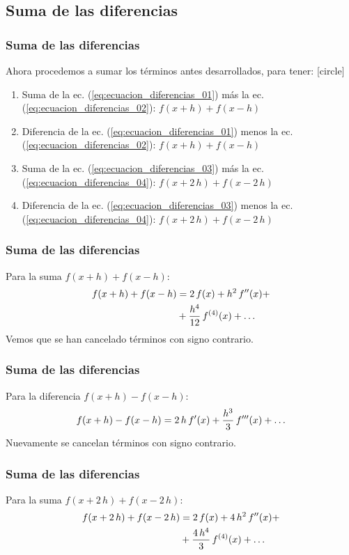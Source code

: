 \subsection*{Suma de las diferencias}
\begin{frame}
\frametitle{Suma de las diferencias}
Ahora procedemos a sumar los términos antes desarrollados, para tener:
[circle]
\begin{enumerate}[<+->]
\item Suma de la ec. (\ref{eq:ecuacion_diferencias_01}) más la ec. (\ref{eq:ecuacion_diferencias_02}): $f(x + h) + f(x - h)$
\item Diferencia de la ec. (\ref{eq:ecuacion_diferencias_01}) menos la ec. (\ref{eq:ecuacion_diferencias_02}): $f(x + h) + f(x - h)$
\item Suma de la ec. (\ref{eq:ecuacion_diferencias_03}) más la ec. (\ref{eq:ecuacion_diferencias_04}): $f(x + 2 \, h) + f(x - 2 \, h)$
\item Diferencia de la ec. (\ref{eq:ecuacion_diferencias_03}) menos la ec. (\ref{eq:ecuacion_diferencias_04}): $f(x + 2 \, h) + f(x - 2\,  h)$
\end{enumerate}
\end{frame}
\begin{frame}
\frametitle{Suma de las diferencias}
Para la suma $f(x + h) + f(x - h)$:
\begin{align}
\begin{aligned}
f(x + h) + f(x - h) &= 2 \, f(x) + h^{2} \, {f}^{\prime \prime} (x) + \\ 
&+\dfrac{h^{4}}{12} \, {f}^{(4)} (x) + \ldots
\end{aligned}
\label{eq:ecuacion_diferencias_1p2}
\end{align}
Vemos que se han cancelado términos con signo contrario.
\end{frame}
\begin{frame}
\frametitle{Suma de las diferencias}
Para la diferencia $f(x + h) - f(x - h)$:
\begin{align}
f(x + h) - f(x - h) = 2 \, h \, {f}^{\prime} (x) + \dfrac{h^{3}}{3} \, {f}^{\prime \prime \prime} (x) + \ldots
\label{eq:ecuacion_diferencias_1m2}
\end{align}
Nuevamente se cancelan términos con signo contrario.
\end{frame}
\begin{frame}
\frametitle{Suma de las diferencias}
Para la suma $f(x + 2\, h) + f(x - 2\, h)$:
\begin{align}
\begin{aligned}
f(x + 2 \, h) + f(x - 2 \, h) &= 2 \, f(x) + 4 \, h^{2} \, {f}^{\prime \prime} (x) + \\
&+ \dfrac{4 \, h^{4}}{3} \, {f}^{(4)} (x) +\ldots
\end{aligned}
\label{eq:ecuacion_diferencias_3p4}
\end{align}
\end{frame}
